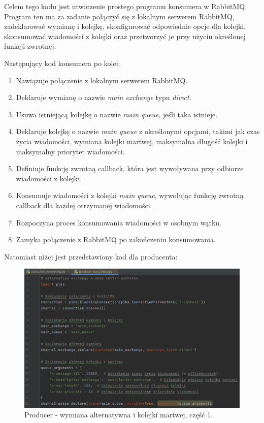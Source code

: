 \documentclass[12pt,twoside]{article}
\begin{document}
Celem tego kodu jest utworzenie prostego programu konsumera w RabbitMQ. Program ten ma za zadanie połączyć się z lokalnym serwerem RabbitMQ, zadeklarować wymianę i kolejkę, skonfigurować odpowiednie opcje dla kolejki, skonsumować wiadomości z kolejki oraz przetworzyć je przy użyciu określonej funkcji zwrotnej. 

Następujący kod konsumera po kolei:
\begin{enumerate}[label=\arabic*), leftmargin=1.25cm]
	\item Nawiązuje połączenie z lokalnym serwerem RabbitMQ.
	\item Deklaruje wymianę o nazwie \textit{main exchange} typu \textit{direct}.
	\item Usuwa istniejącą kolejkę o nazwie \textit{main queue}, jeśli taka istnieje.
	\item Deklaruje kolejkę o nazwie \textit{main queue} z określonymi opcjami, takimi jak czas życia wiadomości, wymiana kolejki martwej, maksymalna długość kolejki i maksymalny priorytet wiadomości.
	\item Definiuje funkcję zwrotną callback, która jest wywoływana przy odbiorze wiadomości z kolejki.
	\item Konsumuje wiadomości z kolejki \textit{main queue}, wywołując funkcję zwrotną callback dla każdej otrzymanej wiadomości.
	\item Rozpoczyna proces konsumowania wiadomości w osobnym wątku.
	\item Zamyka połączenie z RabbitMQ po zakończeniu konsumowania.
\end{enumerate}
\clearpage

Natomiast niżej jest przedstawiony kod dla producenta:

\begin{figure}[!htb]
	\centering
	\includegraphics[width=1\textwidth]{figures/fig14}
	\caption{Producer - wymiana alternatywna i kolejki martwej, część 1.}
	\label{fig:zdjecie}
\end{figure}
\end{document}
